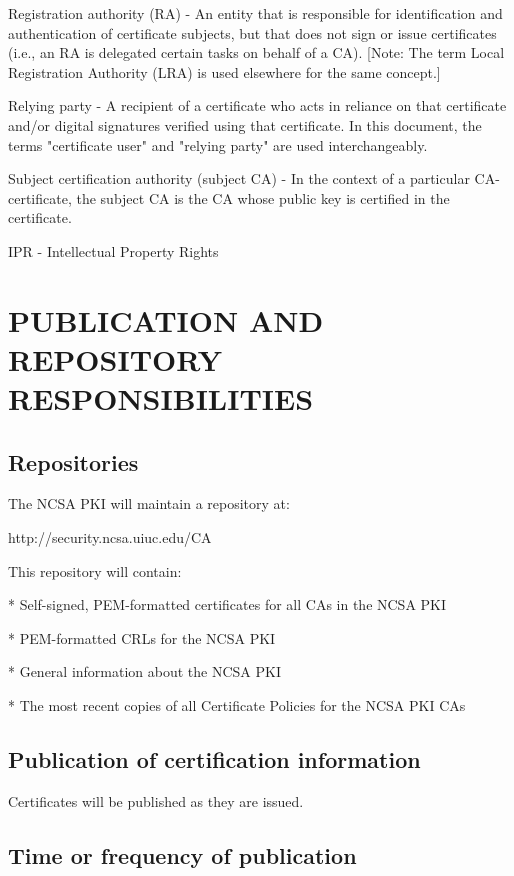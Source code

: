 \documentclass[10pt]{article}
\begin{document}
Registration authority (RA) - An entity that is 
responsible for identification and authentication of 
certificate subjects, but that does not sign or issue 
certificates (i.e., an RA is delegated certain tasks on 
behalf of a CA). [Note: The term Local Registration 
Authority (LRA) is used elsewhere for the same concept.] 
 
Relying party - A recipient of a certificate who acts in 
reliance on that certificate and/or digital signatures 
verified using that certificate. In this document, the 
terms "certificate user" and "relying party" are used 
interchangeably. 
 
Subject certification authority (subject CA) - In the 
context of a particular CA-certificate, the subject CA 
is the CA whose public key is certified in the certificate. 
 
IPR - Intellectual Property Rights 
 
\section{PUBLICATION AND REPOSITORY RESPONSIBILITIES}

\subsection{Repositories}

The NCSA PKI will maintain a repository at:

http://security.ncsa.uiuc.edu/CA

This repository will contain:

* Self-signed, PEM-formatted certificates for all CAs in the NCSA PKI

* PEM-formatted CRLs for the NCSA PKI

* General information about the NCSA PKI

* The most recent copies of all Certificate Policies for the NCSA PKI
CAs

\subsection{Publication of certification information}

Certificates will be published as they are issued.

\subsection{Time or frequency of publication}
\end{document}
